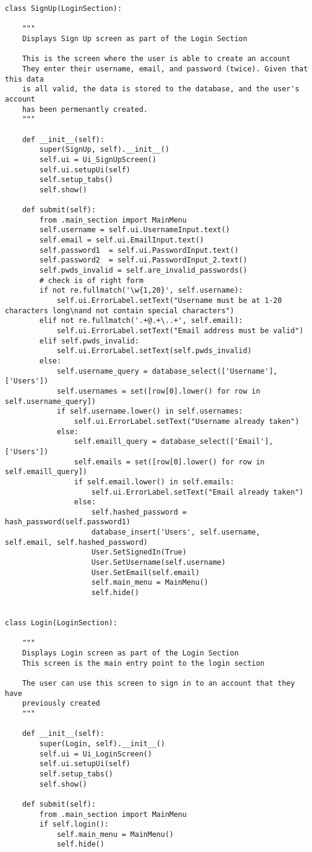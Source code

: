 \documentclass{article}
\begin{document}
\begin{lstlisting}
class SignUp(LoginSection):

    """
    Displays Sign Up screen as part of the Login Section

    This is the screen where the user is able to create an account
    They enter their username, email, and password (twice). Given that this data
    is all valid, the data is stored to the database, and the user's account
    has been permenantly created.
    """

    def __init__(self):
        super(SignUp, self).__init__()
        self.ui = Ui_SignUpScreen()
        self.ui.setupUi(self)
        self.setup_tabs()
        self.show()

    def submit(self):
        from .main_section import MainMenu
        self.username = self.ui.UsernameInput.text()
        self.email = self.ui.EmailInput.text()
        self.password1  = self.ui.PasswordInput.text()
        self.password2  = self.ui.PasswordInput_2.text()
        self.pwds_invalid = self.are_invalid_passwords()
        # check is of right form
        if not re.fullmatch('\w{1,20}', self.username):
            self.ui.ErrorLabel.setText("Username must be at 1-20 characters long\nand not contain special characters")
        elif not re.fullmatch('.+@.+\..+', self.email):
            self.ui.ErrorLabel.setText("Email address must be valid")
        elif self.pwds_invalid:
            self.ui.ErrorLabel.setText(self.pwds_invalid)
        else:
            self.username_query = database_select(['Username'], ['Users'])
            self.usernames = set([row[0].lower() for row in self.username_query])
            if self.username.lower() in self.usernames:
                self.ui.ErrorLabel.setText("Username already taken")
            else:
                self.emaill_query = database_select(['Email'], ['Users'])
                self.emails = set([row[0].lower() for row in self.emaill_query])
                if self.email.lower() in self.emails:
                    self.ui.ErrorLabel.setText("Email already taken")
                else:
                    self.hashed_password = hash_password(self.password1)
                    database_insert('Users', self.username, self.email, self.hashed_password)
                    User.SetSignedIn(True)
                    User.SetUsername(self.username)
                    User.SetEmail(self.email)
                    self.main_menu = MainMenu()
                    self.hide()


class Login(LoginSection):

    """
    Displays Login screen as part of the Login Section
    This screen is the main entry point to the login section

    The user can use this screen to sign in to an account that they have
    previously created
    """

    def __init__(self):
        super(Login, self).__init__()
        self.ui = Ui_LoginScreen()
        self.ui.setupUi(self)
        self.setup_tabs()
        self.show()

    def submit(self):
        from .main_section import MainMenu
        if self.login():
            self.main_menu = MainMenu()
            self.hide()
\end{lstlisting}
\end{document}

